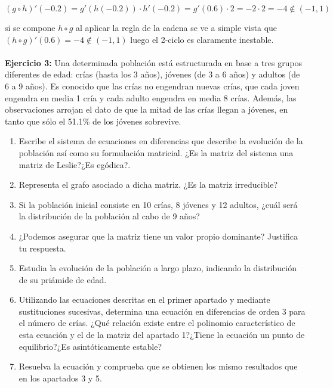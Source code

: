 \documentclass{article}
\begin{document}
\begin{equation*}
(g \circ h)'(-0.2) = g'(h(-0.2))\cdot h'(-0.2) = g'(0.6) \cdot 2 = -2 \cdot 2 = -4 \notin (-1,1)
\end{equation*}

si se compone $h \circ g$ al aplicar la regla de la cadena se ve a simple vista que $(h \circ g)'(0.6) = -4 \notin (-1,1)$ luego el 2-ciclo es claramente inestable. \\ \\

\textbf{Ejercicio 3:} Una determinada población está estructurada en base a tres grupos diferentes de edad: crías (hasta los 3 años), jóvenes (de 3 a 6 años) y adultos (de 6 a 9 años). Es conocido que las crías no engendran nuevas crías, que cada joven engendra en media 1 cría y cada adulto engendra en media 8 crías. Además, las observaciones arrojan el dato de que la mitad de las crías llegan a jóvenes, en tanto que sólo el 51.1\% de los jóvenes sobrevive.

\begin{enumerate}
\item Escribe el sistema de ecuaciones en diferencias que describe la evolución de la población así como su formulación matricial. ¿Es la matriz del sistema una matriz de Leslie?¿Es egódica?.

\item Representa el grafo asociado a dicha matriz. ¿Es la matriz irreducible?

\item Si la población inicial consiste en 10 crías, 8 jóvenes y 12 adultos, ¿cuál será la distribución de la población al cabo de 9 años?

\item ¿Podemos asegurar que la matriz tiene un valor propio dominante? Justifica tu respuesta.

\item Estudia la evolución de la población a largo plazo, indicando la distribución de su priámide de edad.

\item Utilizando las ecuaciones descritas en el primer apartado y mediante sustituciones sucesivas, determina una ecuación en diferencias de orden 3 para el número de crías. ¿Qué relación existe entre el polinomio característico de esta ecuación y el de la matriz del apartado 1?¿Tiene la ecuación un punto de equilibrio?¿Es asintóticamente estable?

\item Resuelva la ecuación y comprueba que se obtienen los mismo resultados que en los apartados 3 y 5.
\end{enumerate}
\end{document}
